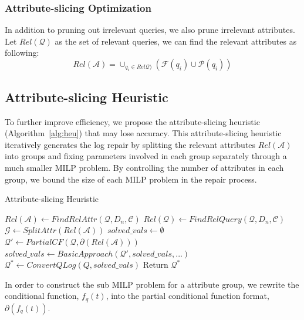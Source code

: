 \subsubsection{Attribute-slicing Optimization}
In addition to pruning out irrelevant queries,
we also prune irrelevant attributes. \\
Let $Rel\mathcal{(Q)}$ as the set of 
relevant queries, we can find the relevant 
attributes as following:
\[Rel\mathcal{(A)} = \cup_{q_i \in Rel\mathcal{Q)}} 
(\mathcal{F}(q_i)\cup \mathcal{P}(q_i)) \]
\subsection{Attribute-slicing Heuristic}
\label{sec:heurstic}
To further improve efficiency, we propose the attribute-slicing heuristic 
(Algorithm~\ref{alg:heu}) that may lose accuracy. This attribute-slicing
heuristic iteratively
generates the log repair by splitting the relevant 
attributes $Rel\mathcal{(A)}$ into
groups and fixing parameters involved 
in each group separately through a 
much smaller MILP problem. By 
controlling the number of attributes 
in each group, we bound the size of 
each MILP problem in the repair process.
\begin{algorithm}[htbp]
\caption{Attribute-slicing Heuristic}
\label{alg:heu}
\begin{algorithmic}
\STATE $Rel\mathcal{(A)} \leftarrow FindRelAttr(\mathcal{Q}, D_n, \mathcal{C})$
\STATE $Rel\mathcal{(Q)} \leftarrow FindRelQuery(\mathcal{Q}, D_n, \mathcal{C})$
\STATE $\mathcal{G} \leftarrow SplitAttr(Rel\mathcal{(A)})$
\STATE $solved\_vals \leftarrow \emptyset$
\STATE $\mathcal{Q'} \leftarrow PartialCF(\mathcal{Q}, \partial (Rel\mathcal{(A)}))$
\STATE $solved\_vals \leftarrow BasicApproach(\mathcal{Q'}, solved\_vals, ...)$
\ENDFOR
\STATE $\mathcal{Q}^* \leftarrow ConvertQLog(Q, solved\_vals)$
\STATE Return $\mathcal{Q}^*$
\end{algorithmic}
\end{algorithm}

In order to construct the sub MILP problem 
for a attribute group, we rewrite the conditional 
function, $f_q(t)$, into 
the partial conditional function format, $\partial (f_q(t))$.

